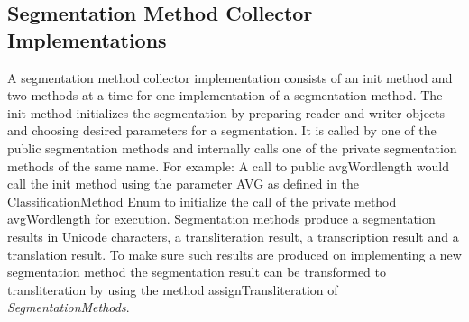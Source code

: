 \documentclass[10pt,a4paper,titlepage]{report}
\begin{document}
	\subsection{Segmentation Method Collector Implementations}
	A segmentation method collector implementation consists of an init method and two methods at a time for one implementation of a segmentation method. The init method initializes the segmentation by preparing reader and writer objects and choosing desired parameters for a segmentation. It is called by one of the public segmentation methods and internally calls one of the private segmentation methods of the same name. For example: A call to public avgWordlength would call the init method using the parameter AVG as defined in the ClassificationMethod Enum to initialize the call of the private method avgWordlength for execution. Segmentation methods produce a segmentation results in Unicode characters, a transliteration result, a transcription result and a translation result. To make sure such results are produced on implementing a new segmentation method the segmentation result can be transformed to transliteration by using the method assignTransliteration of \textit{SegmentationMethods}.
\end{document}
